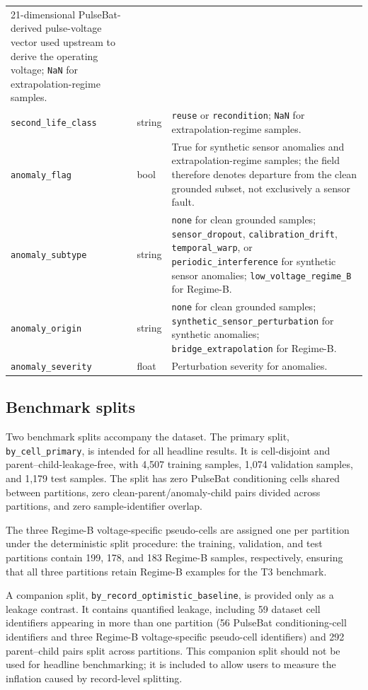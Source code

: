 \documentclass[11pt]{article}
\begin{document}
\begin{table}[!htb]
\begin{tabularx}{\textwidth}{@{}llX@{}}
21-dimensional PulseBat-derived pulse-voltage vector used upstream to derive
the operating voltage; \texttt{NaN} for extrapolation-regime samples. \\
\texttt{second\_life\_class} & string  & \texttt{reuse} or \texttt{recondition}; \texttt{NaN} for extrapolation-regime samples. \\
\texttt{anomaly\_flag} & bool &
True for synthetic sensor anomalies and extrapolation-regime samples;
the field therefore denotes departure from the clean grounded subset,
not exclusively a sensor fault. \\
\texttt{anomaly\_subtype} & string & \texttt{none} for clean grounded samples; \texttt{sensor\_dropout}, \texttt{calibration\_drift}, \texttt{temporal\_warp}, or \texttt{periodic\_interference} for synthetic sensor anomalies; \texttt{low\_voltage\_regime\_B} for Regime-B. \\
\texttt{anomaly\_origin} & string & \texttt{none} for clean grounded samples; \texttt{synthetic\_sensor\_perturbation} for synthetic anomalies; \texttt{bridge\_extrapolation} for Regime-B. \\
\texttt{anomaly\_severity}   & float   & Perturbation severity for anomalies. \\
\bottomrule
\end{tabularx}
\end{table}

\subsection*{Benchmark splits}

Two benchmark splits accompany the dataset. The primary split,
\texttt{by\_cell\_primary}, is intended for all headline results. It is
cell-disjoint and parent--child-leakage-free, with 4,507 training samples,
1,074 validation samples, and 1,179 test samples. The split has zero
PulseBat conditioning cells shared between partitions, zero
clean-parent/anomaly-child pairs divided across partitions, and zero
sample-identifier overlap.

The three Regime-B voltage-specific pseudo-cells are assigned one per
partition under the deterministic split procedure: the training,
validation, and test partitions contain 199, 178, and 183 Regime-B
samples, respectively, ensuring that all three partitions retain
Regime-B examples for the T3 benchmark.

A companion split, \texttt{by\_record\_optimistic\_baseline}, is provided
only as a leakage contrast. It contains quantified leakage, including
59 dataset cell identifiers appearing in more than one partition
(56 PulseBat conditioning-cell identifiers and three Regime-B
voltage-specific pseudo-cell identifiers) and 292 parent--child pairs
split across partitions. This companion split should not be used for
headline benchmarking; it is included to allow users to measure the
inflation caused by record-level splitting.
\end{document}
